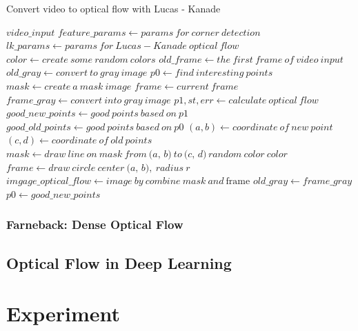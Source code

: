 \documentclass[a4paper, 12pt]{article}
\begin{document}
\begin{algorithm}
    \caption{Convert video to optical flow with Lucas - Kanade}
    \begin{algorithmic}[1]
        \Require $video\_input$
        \State $feature\_params \gets params \ for \ corner \ detection$
        \State $lk\_params \gets params \ for \ Lucas - Kanade \ optical \ flow$
        \State $color \gets create \ some \ random \ colors$
        \State $old\_frame \gets the \ first \ frame \ of \ video \ input $
        \State $old\_gray \gets convert \ to \ gray \ image$
        \State $p0 \gets find \ interesting \ points$
        \State $mask \gets create \ a \ mask \ image$
            \State $frame \gets current \ frame$
            \State $frame\_gray \gets convert \ into \ gray \ image$
            \State $p1, st, err \gets calculate \ optical \ flow $ 
            \State $good\_new\_points \gets good \ points \ based \ on \ p1$
            \State $good\_old\_points \gets good \ points \ based \ on \ p0$
                \State $(a, b) \gets coordinate \ of \ new \ point$
                \State $(c, d) \gets coordinate \ of \ old \ points $
                \State $mask \gets draw \ line \ on \ \textit{mask} \ from \ \textit{(a, b)} \ to \ \textit{(c, d)} \, random \ color \ \textit{color}$
                \State $frame \gets draw \ circle \ center \ \textit{(a, b)}, \ radius \ \textit{r}$
            \EndFor
            \State $imgage\_optical\_flow \gets image \ by \ combine \ \textit{mask} \ and \ \text{frame}$
            \State $old\_gray \gets \textit{frame_gray}$
            \State $p0 \gets \textit{good\_new\_points}$
        \EndWhile
    \end{algorithmic}
\end{algorithm}

\subsubsection{Farneback: Dense Optical Flow}
\subsection{Optical Flow in Deep Learning}

\section{Experiment}
\end{document}
